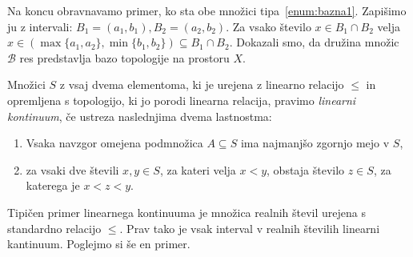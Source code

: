 \documentclass[../TG_magistrsko_delo_sections.tex]{subfiles}
\begin{document}
Na koncu obravnavamo primer, ko sta obe množici tipa~\ref{enum:bazna1}. Zapišimo ju z intervali: $B_1 = (a_1, b_1), B_2 =(a_2, b_2)$. Za vsako število $x \in B_1 \cap B_2$ velja $x \in (\max\{a_1, a_2\}, \min\{b_1, b_2\}) \subseteq B_1 \cap B_2$. Dokazali smo, da družina množic $\mathcal{B}$ res predstavlja bazo topologije na prostoru $X$.

\begin{definicija}
Množici $S$ z vsaj dvema elementoma, ki je urejena z linearno relacijo $\leq$ in opremljena s topologijo, ki jo porodi linearna relacija, pravimo \emph{linearni kontinuum}, če ustreza naslednjima dvema lastnostma:
\begin{enumerate}
\item Vsaka navzgor omejena podmnožica $A \subseteq S$ ima najmanjšo zgornjo mejo v $S$,\label{enum:L1}
\item za vsaki dve števili $x, y \in S$, za kateri velja $x<y$, obstaja število $z \in S$, za katerega je $x<z<y$.\label{enum:L2}
\end{enumerate}
\end{definicija}

Tipičen primer linearnega kontinuuma je množica realnih števil urejena s standardno relacijo $\leq$. Prav tako je vsak interval v realnih številih linearni kantinuum. Poglejmo si še en primer. 
\end{document}

